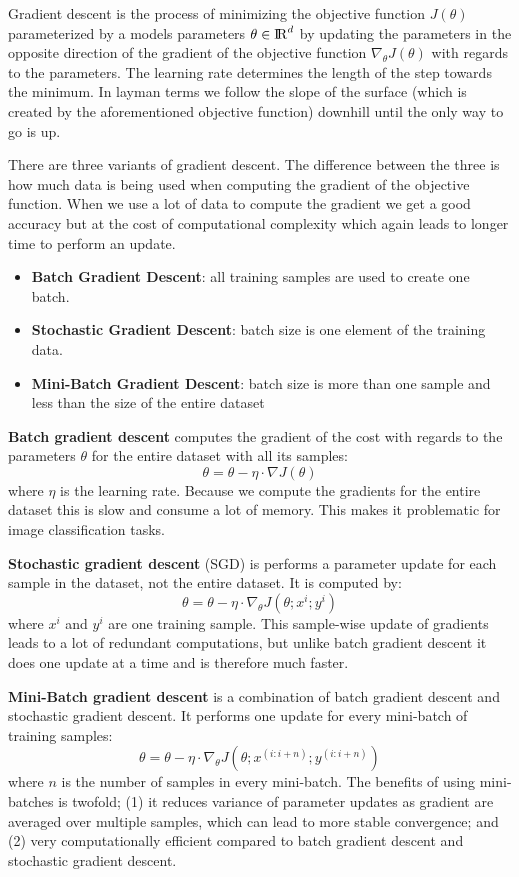 \documentclass[thesis.tex]{subfiles}
\begin{document}
Gradient descent is the process of minimizing the objective function $J(\theta)$ parameterized by a models parameters $\theta \in {\rm I\!R}^d$ by updating the parameters in the opposite direction of the gradient of the objective function $\nabla_{\theta} J(\theta)$ with regards to the parameters. The learning rate determines the length of the step towards the minimum. In layman terms we follow the slope of the surface (which is created by the aforementioned objective function) downhill until the only way to go is up.

There are three variants of gradient descent. The difference between the three is how much data is being used when computing the gradient of the objective function. When we use a lot of data to compute the gradient we get a good accuracy but at the cost of computational complexity which again leads to longer time to perform an update.
\begin{itemize}
\item \textbf{Batch Gradient Descent}: all training samples are used to create one batch.
\item \textbf{Stochastic Gradient Descent}: batch size is one element of the training data.
\item \textbf{Mini-Batch Gradient Descent}: batch size is more than one sample and less than the size of the entire dataset
\end{itemize}

\textbf{Batch gradient descent} computes the gradient of the cost with regards to the parameters $\theta$ for the entire dataset with all its samples: 
$$ \theta = \theta - \eta \cdot \nabla J(\theta) $$ 
where $\eta$ is the learning rate. Because we compute the gradients for the entire dataset this is slow and consume a lot of memory. This makes it problematic for image classification tasks.

\textbf{Stochastic gradient descent} (SGD) is performs a parameter update for each sample in the dataset, not the entire dataset. It is computed by: 
$$ \theta = \theta - \eta \cdot \nabla_{\theta} J(\theta;x^{i};y^{i}) $$ 
where $x^i$ and $y^i$ are one training sample. This sample-wise update of gradients leads to a lot of redundant computations, but unlike batch gradient descent it does one update at a time and is therefore much faster.

\textbf{Mini-Batch gradient descent} is a combination of batch gradient descent and stochastic gradient descent. It performs one update for every mini-batch of training samples: 
$$ \theta = \theta - \eta \cdot \nabla_{\theta}J(\theta;x^{(i:i+n)};y^{(i:i+n)}) $$ 
where $n$ is the number of samples in every mini-batch. The benefits of using mini-batches is twofold; (1) it reduces variance of parameter updates as gradient are averaged over multiple samples, which can lead to more stable convergence; and (2) very computationally efficient compared to batch gradient descent and stochastic gradient descent.
\end{document}
